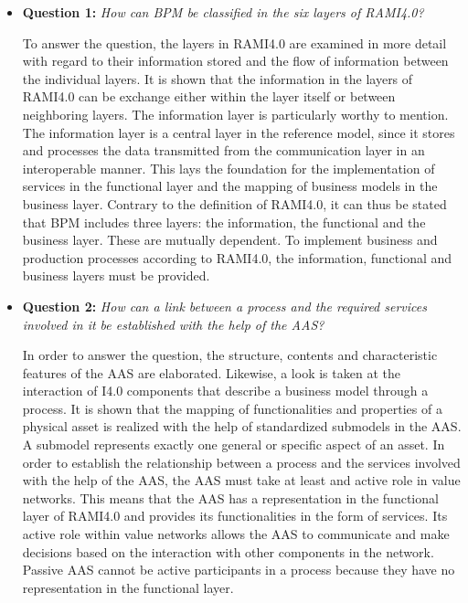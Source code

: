 \begin{itemize}
    \item [] \textbf{Question 1:} \textit{How can \ac{BPM} be classified in the six layers of \ac{RAMI4.0}?}
    
    To answer the question, the layers in \ac{RAMI4.0} are examined in more detail with regard to their information stored and the flow of information between the individual layers. It is shown that the information in the layers of \ac{RAMI4.0} can be exchange either within the layer itself or between neighboring layers. The information layer is particularly worthy to mention. The information layer is a central layer in the reference model, since it stores and processes the data transmitted from the communication layer in an interoperable manner. This lays the foundation for the implementation of services in the functional layer and the mapping of business models in the business layer. Contrary to the definition of \ac{RAMI4.0}, it can thus be stated that \ac{BPM} includes three layers: the information, the functional and the business layer. These are mutually dependent. To implement business and production processes according to \ac{RAMI4.0}, the information, functional and business layers must be provided. 
    
    \item [] \textbf{Question 2:} \textit{How can a link between a process and the required services involved in it be established with the help of the \ac{AAS}?}
    
    In order to answer the question, the structure, contents and characteristic features of the \ac{AAS} are elaborated. Likewise, a look is taken at the interaction of \ac{I4.0} components that describe a business model through a process. It is shown that the mapping of functionalities and properties of a physical asset is realized with the help of standardized submodels in the \ac{AAS}. A submodel represents exactly one general or specific aspect of an asset. In order to establish the relationship between a process and the services involved with the help of the \ac{AAS}, the \ac{AAS} must take at least and active role in value networks. This means that the \ac{AAS} has a representation in the functional layer of \ac{RAMI4.0} and provides its functionalities in the form of services. Its active role within value networks allows the \ac{AAS} to communicate and make decisions based on the interaction with other components in the network. Passive \ac{AAS} cannot be active participants in a process because they have no representation in the functional layer.
    

\end{itemize}
